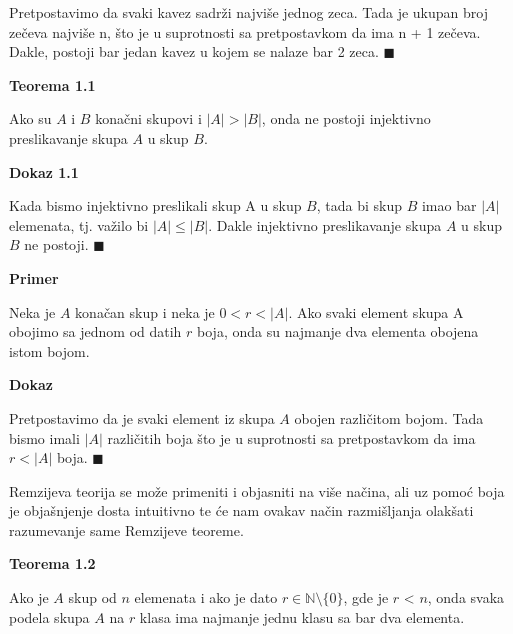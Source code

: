 \documentclass[12pt,a4paper]{article}
\begin{document}
	\noindent Pretpostavimo da svaki kavez sadrži najviše jednog zeca. Tada je ukupan broj zečeva
	najviše n, što je u suprotnosti sa pretpostavkom da ima n + 1 zečeva. Dakle, postoji bar jedan kavez u kojem se nalaze bar 2 zeca. $\blacksquare$
	\vspace{1.5em}	

	{\noindent\fontsize{12pt}{12pt}\textbf{Teorema 1.1}}
	\vspace{0.5em}

	\noindent Ako su $A$ i $B$ konačni skupovi i $|A| > |B|$, onda ne postoji injektivno preslikavanje skupa $A$ u
	skup $B$.
	\vspace{0.5em}

	{\noindent\fontsize{12pt}{12pt}\textbf{Dokaz 1.1}}
	\vspace{0.5em}	

	\noindent  Kada bismo injektivno preslikali skup A
	u skup $B$, tada bi skup $B$ imao bar $|A|$ elemenata, tj. važilo bi $|A| \leq |B|$. Dakle injektivno preslikavanje skupa $A$ u skup $B$ ne postoji. $\blacksquare$

	\vspace{1.5em}
	{\noindent\fontsize{12pt}{12pt}\textbf{Primer}}
	\vspace{0.5em}

	\noindent Neka je $A$ konačan skup i neka je $0 < r < |A|$.
	Ako svaki element skupa A obojimo sa jednom od datih $r$ boja, onda su najmanje dva
	elementa obojena istom bojom.
	\vspace{0.5em}

	{\noindent\fontsize{12pt}{12pt}\textbf{Dokaz}}
	\vspace{0.5em}	

	\noindent Pretpostavimo da je svaki element iz skupa $A$ obojen različitom bojom. Tada bismo
	imali $|A|$ različitih boja što je u suprotnosti sa pretpostavkom da ima $r < |A|$ boja. $\blacksquare$\\

	\vspace{0.8em}

	\noindent Remzijeva teorija se može primeniti i objasniti na više načina, ali uz pomoć boja 
	je objašnjenje dosta intuitivno te će nam ovakav način razmišljanja olakšati razumevanje same Remzijeve teoreme.

	\vspace{0.8em}
	{\noindent\fontsize{12pt}{12pt}\textbf{Teorema 1.2}}
	\vspace{0.5em}

	\noindent Ako je $A$ skup od $n$ elemenata i ako je dato $r \in \mathbb{N}\setminus \lbrace 0 \rbrace$, gde je $r$ < $n$, onda svaka podela skupa $A$ na $r$ klasa ima najmanje jednu klasu sa bar dva elementa.
	\vspace{1.5em}
\end{document}
